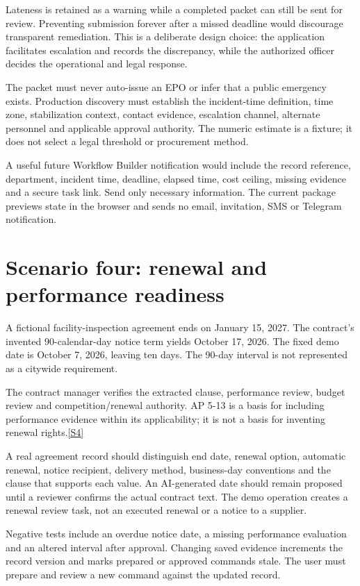\documentclass[11pt,letterpaper]{article}
\newcommand{\src}[1]{\hyperref[src:#1]{[#1]}}
\begin{document}
Lateness is retained as a warning while a completed packet can still be sent for review. Preventing submission forever after a missed deadline would discourage transparent remediation. This is a deliberate design choice: the application facilitates escalation and records the discrepancy, while the authorized officer decides the operational and legal response.

The packet must never auto-issue an EPO or infer that a public emergency exists. Production discovery must establish the incident-time definition, time zone, stabilization context, contact evidence, escalation channel, alternate personnel and applicable approval authority. The numeric estimate is a fixture; it does not select a legal threshold or procurement method.

A useful future Workflow Builder notification would include the record reference, department, incident time, deadline, elapsed time, cost ceiling, missing evidence and a secure task link. Send only necessary information. The current package previews state in the browser and sends no email, invitation, SMS or Telegram notification.

\section{Scenario four: renewal and performance readiness}
A fictional facility-inspection agreement ends on January 15, 2027. The contract's invented 90-calendar-day notice term yields October 17, 2026. The fixed demo date is October 7, 2026, leaving ten days. The 90-day interval is not represented as a citywide requirement.

The contract manager verifies the extracted clause, performance review, budget review and competition/renewal authority. AP 5-13 is a basis for including performance evidence within its applicability; it is not a basis for inventing renewal rights.\src{S4}

A real agreement record should distinguish end date, renewal option, automatic renewal, notice recipient, delivery method, business-day conventions and the clause that supports each value. An AI-generated date should remain proposed until a reviewer confirms the actual contract text. The demo operation creates a renewal review task, not an executed renewal or a notice to a supplier.

Negative tests include an overdue notice date, a missing performance evaluation and an altered interval after approval. Changing saved evidence increments the record version and marks prepared or approved commands stale. The user must prepare and review a new command against the updated record.
\end{document}
